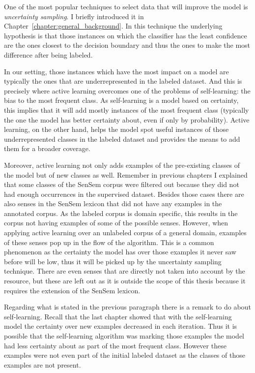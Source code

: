 One of the most popular techniques to select data that will improve the model
is {\em uncertainty sampling}. I briefly introduced it in
Chapter~\ref{chapter:general_background}. In this technique the underlying
hypothesis is that those instances on which the classifier has the least
confidence are the ones closest to the decision boundary and thus the ones to
make the most difference after being labeled.

In our setting, those instances which have the most impact on a model are
typically the ones that are underrepresented in the labeled dataset. And this
is precisely where active learning overcomes one of the problems of
self-learning: the bias to the most frequent class. As self-learning is a model
based on certainty, this implies that it will add mostly instances of the most
frequent class (typically the one the model has better certainty about, even if
only by probability). Active learning, on the other hand, helps the model spot
useful instances of those underrepresented classes in the labeled dataset and
provides the means to add them for a broader coverage.

Moreover, active learning not only adds examples of the pre-existing classes of
the model but of new classes as well. Remember in previous chapters I explained
that some classes of the SenSem corpus were filtered out because they did not
had enough occurrences in the supervised dataset. Besides those cases there are
also senses in the SenSem lexicon that did not have any examples in the
annotated corpus. As the labeled corpus is domain specific, this results in
the corpus not having examples of some of the possible senses. However, when
applying active learning over an unlabeled corpus of a general domain, examples
of these senses pop up in the flow of the algorithm. This is a common
phenomenon as the certainty the model has over those examples it never saw
before will be low, thus it will be picked up by the uncertainty sampling
technique. There are even senses that are directly not taken into account by
the resource, but these are left out as it is outside the scope of this thesis
because it requires the extension of the SenSem lexicon.

Regarding what is stated in the previous paragraph there is a remark to do
about self-learning. Recall that the last chapter showed that with the
self-learning model the certainty over new examples decreased in each
iteration. Thus it is possible that the self-learning algorithm was marking
those examples the model had less certainty about as part of the most frequent
class. However these examples were not even part of the initial labeled dataset
as the classes of those examples are not present.

